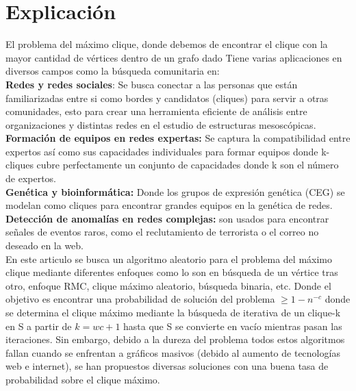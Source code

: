 \section{Explicación}
El problema del máximo clique, donde debemos de encontrar el clique con la mayor cantidad de vértices dentro de un grafo dado
Tiene varias aplicaciones en diversos campos como la búsqueda comunitaria en: \\
\textbf{Redes y redes sociales}: Se busca conectar a las personas que están familiarizadas entre si como bordes y candidatos (cliques) para servir a otras comunidades, esto para crear una herramienta eficiente de análisis entre organizaciones y distintas redes en el estudio de estructuras mesoscópicas.
\\
\textbf{Formación de equipos en redes expertas:} Se captura la compatibilidad entre expertos así como sus capacidades individuales para formar equipos donde k-cliques cubre perfectamente un conjunto de capacidades donde k son el número de expertos.
\\
\textbf{Genética y bioinformática:} Donde los grupos de expresión genética (CEG) se modelan como cliques para encontrar grandes equipos en la genética de redes.
\\
\textbf{Detección de anomalías en redes complejas:} son usados para encontrar señales de eventos raros, como el reclutamiento de terrorista o el correo no deseado en la web.\\

En este articulo se busca un algoritmo aleatorio para el problema del máximo clique mediante diferentes enfoques como lo son en búsqueda de un vértice tras otro, enfoque RMC, clique máximo aleatorio, búsqueda binaria, etc. Donde el objetivo es encontrar una probabilidad de solución del problema \begin{math}
≥1-n^{-c}
\end{math} donde se determina el clique máximo mediante la búsqueda de iterativa de un clique-k en S a partir de  \begin{math} k= wc +1 \end{math} hasta que S se convierte en vacío mientras pasan las iteraciones. Sin embargo, debido a la dureza del problema todos estos algoritmos fallan cuando se enfrentan a gráficos masivos (debido al aumento de tecnologías web e internet), se han propuestos diversas soluciones con una buena tasa de probabilidad sobre el clique máximo.


